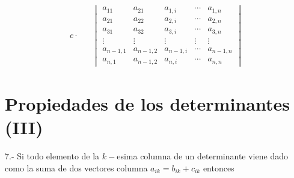 \documentclass[
]{article}
\begin{document}
\begin{equation}
\begin{array}{cc}
c \cdot &  &  \begin{vmatrix} 
     a_{11}     & a_{21}      & a_{1,i}     & \cdots     & a_{1,n}      \\ 
     a_{21}     & a_{22}      & a_{2,i}     & \cdots     & a_{2,n}      \\
     a_{31}     &  a_{32}     & a_{3,i}     &  \cdots    & a_{3,n}      \\
    \vdots      & \vdots      & \vdots       & \vdots     & \vdots \\
     a_{n-1,1}  & a_{n-1,2}   & a_{n-1,i}   & \cdots     & a_{n-1,n}      \\
     a_{n,1}    &  a_{n-1,2}  & a_{n,i}     & \cdots     & a_{n,n}
  \end{vmatrix}
\end{array}
\end{equation}

\hypertarget{propiedades-de-los-determinantes-iii}{%
\section{Propiedades de los determinantes
(III)}\label{propiedades-de-los-determinantes-iii}}

7.- Si todo elemento de la \(k-\)esima columna de un determinante viene
dado como la suma de dos vectores columna \(a_{ik}=b_{ik}+c_{ik}\)
entonces
\end{document}
